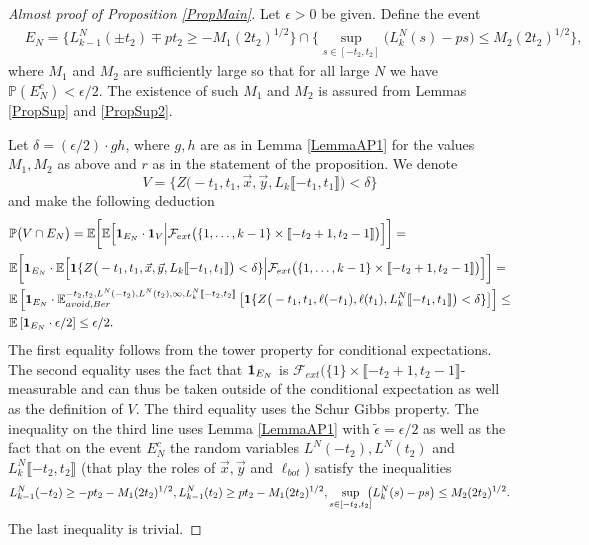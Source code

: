 \begin{proof}[Almost proof of Proposition \ref{PropMain}] Let $\epsilon > 0$ be given. Define the event
	\begin{equation*}
	\begin{split}
	&E_N = \Big\{    L_{k-1}^N(  \pm t_2) \mp pt_2 \geq  - M_1 (2t_2)^{1/2}\Big\} \cap \Big\{ \sup_{s \in [ -t_2, t_2]} \big( {L}^N_{k}(s) - p s \big)\leq M_2  (2t_2)^{1/2} \Big\},
	\end{split}
	\end{equation*}
	where $M_1$ and $M_2$ are sufficiently large so that for all large $N$ we have $\mathbb{P}(E_N^c) <  \epsilon / 2$. The existence of such $M_1$ and $M_2$ is assured from Lemmas \ref{PropSup} and \ref{PropSup2}. 
	
	Let $\delta = (\epsilon/2) \cdot g h$, where $g,h$ are as in Lemma \ref{LemmaAP1} for the values $M_1, M_2$ as above and $r$ as in the statement of the proposition.
	We denote
	$$V = \Big\{Z\big( -t_1,t_1, \vec{x}, \vec{y} , L_{k}\llbracket -t_1, t_1\rrbracket\big)< \delta\Big\}$$
	and make the following deduction
	\begin{equation*}
	\begin{split}
	&\mathbb{P}\big( V \cap E_N \big) =\mathbb{E} \bigg[    \mathbb{E}\Big[{\bf 1}_{E_N} \cdot {\bf 1}_{V} \Big{|} \mathcal{F}_{ext} \big( \{1, \dots, k-1\} \times \llbracket -t_2 + 1,t_2 - 1\rrbracket \big)\Big] \bigg] = \\
	&\mathbb{E} \bigg[ {\bf 1}_{E_N} \cdot   \mathbb{E}\Big[ {\bf 1} \{ Z\big( -t_1,t_1, \vec{x}, \vec{y} , L_{k}\llbracket -t_1, t_1\rrbracket \big) < \delta\}   \Big{|} \mathcal{F}_{ext} \big( \{1, \dots, k-1\} \times \llbracket -t_2 + 1,t_2 - 1\rrbracket \big)\Big] \bigg]  = \\
	&\mathbb{E} \left[ {\bf 1}_{E_N} \cdot  \mathbb{E}^{-t_2, t_2, L^N(-t_2), L^N(t_2), \infty, L^N_k\llbracket -t_2, t_2\rrbracket }_{avoid, Ber}\left[ {\bf 1} \{ Z\big( -t_1, t_1, \ell(-t_1),\ell(t_1),{L}^N_k\llbracket -t_1, t_1\rrbracket \big) < \delta\} \right] \right] \leq \\
	&  \mathbb{E} \left[ {\bf 1}_{E_N} \cdot  \epsilon/2 \right] \leq \epsilon/2.
	\end{split}
	\end{equation*}
	The first equality follows from the tower property for conditional expectations. The second equality uses the fact that ${\bf 1}_{E_N} $ is $\mathcal{F}_{ext} \big( \{1\} \times \llbracket -t_2 + 1,t_2 - 1\rrbracket$-measurable and can thus be taken outside of the conditional expectation as well as the definition of $V$. The third equality uses the Schur Gibbs property. The inequality on the third line uses Lemma \ref{LemmaAP1} with $\tilde{\epsilon} = \epsilon/2$ as well as the fact that on the event $E_N^c$ the random variables $L^N(-t_2), L^N(t_2)$ and $L^N_k \llbracket -t_2, t_2 \rrbracket$ (that play the roles of $\vec{x}, \vec{y}$ and $\ell_{bot}$) satisfy the inequalities 
	$$L^N_{k-1}(-t_2) \geq  -pt_2- M_1 (2t_2)^{1/2},  L^N_{k-1}(t_2) \geq  p t_2- M_1(2t_2)^{1/2}, \sup_{s \in [ -t_2,t_2]} \hspace{-2mm}\big(L^N_k(s)  - ps \big)  \leq M_2(2t_2)^{1/2}.$$
	The last inequality is trivial.
	

\end{proof}
